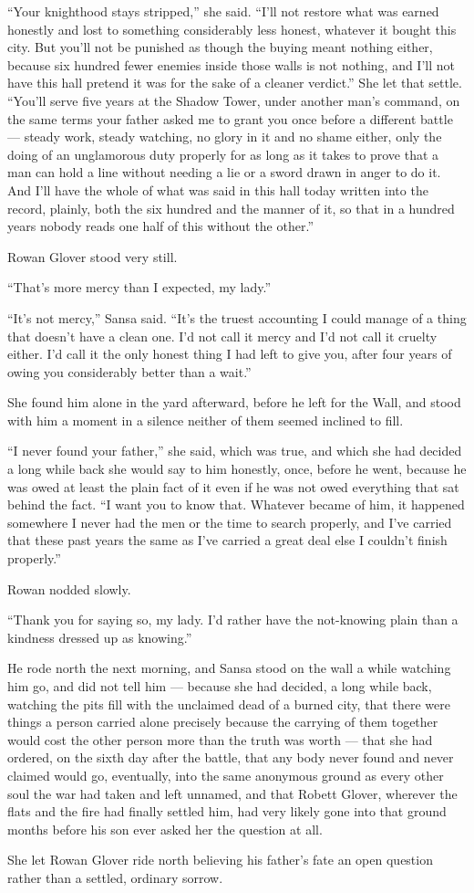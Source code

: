 “Your knighthood stays stripped,” she said. “I’ll not restore what was earned honestly and lost to something considerably less honest, whatever it bought this city. But you’ll not be punished as though the buying meant nothing either, because six hundred fewer enemies inside those walls is not nothing, and I’ll not have this hall pretend it was for the sake of a cleaner verdict.” She let that settle. “You’ll serve five years at the Shadow Tower, under another man’s command, on the same terms your father asked me to grant you once before a different battle — steady work, steady watching, no glory in it and no shame either, only the doing of an unglamorous duty properly for as long as it takes to prove that a man can hold a line without needing a lie or a sword drawn in anger to do it. And I’ll have the whole of what was said in this hall today written into the record, plainly, both the six hundred and the manner of it, so that in a hundred years nobody reads one half of this without the other.”

Rowan Glover stood very still.

“That’s more mercy than I expected, my lady.”

“It’s not mercy,” Sansa said. “It’s the truest accounting I could manage of a thing that doesn’t have a clean one. I’d not call it mercy and I’d not call it cruelty either. I’d call it the only honest thing I had left to give you, after four years of owing you considerably better than a wait.”

\sceneBreak

She found him alone in the yard afterward, before he left for the Wall, and stood with him a moment in a silence neither of them seemed inclined to fill.

“I never found your father,” she said, which was true, and which she had decided a long while back she would say to him honestly, once, before he went, because he was owed at least the plain fact of it even if he was not owed everything that sat behind the fact. “I want you to know that. Whatever became of him, it happened somewhere I never had the men or the time to search properly, and I’ve carried that these past years the same as I’ve carried a great deal else I couldn’t finish properly.”

Rowan nodded slowly.

“Thank you for saying so, my lady. I’d rather have the not-knowing plain than a kindness dressed up as knowing.”

He rode north the next morning, and Sansa stood on the wall a while watching him go, and did not tell him — because she had decided, a long while back, watching the pits fill with the unclaimed dead of a burned city, that there were things a person carried alone precisely because the carrying of them together would cost the other person more than the truth was worth — that she had ordered, on the sixth day after the battle, that any body never found and never claimed would go, eventually, into the same anonymous ground as every other soul the war had taken and left unnamed, and that Robett Glover, wherever the flats and the fire had finally settled him, had very likely gone into that ground months before his son ever asked her the question at all.

She let Rowan Glover ride north believing his father’s fate an open question rather than a settled, ordinary sorrow.